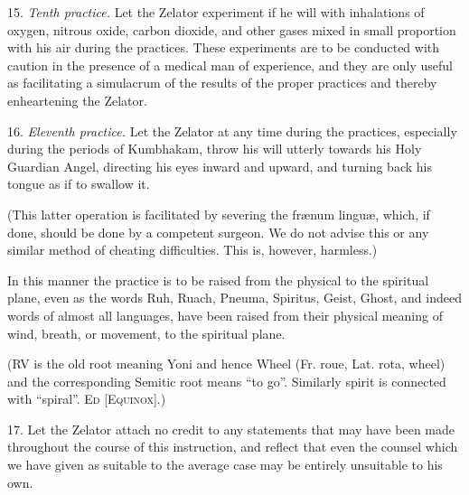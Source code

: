 15. \textit{Tenth practice.} \textemdash{} Let the Zelator experiment if he will with inhalations of oxygen, nitrous oxide, carbon dioxide, and other gases mixed in small proportion with his air during the practices. These experiments are to be conducted with caution in the presence of a medical man of experience, and they are only useful as facilitating a simulacrum of the results of the proper practices and thereby enheartening the Zelator.

16. \textit{Eleventh practice.} \textemdash{} Let the Zelator at any time during the practices, especially during the periods of Kumbhakam, throw his will utterly towards his Holy Guardian Angel, directing his eyes inward and upward, and turning back his tongue as if to swallow it.

(This latter operation is facilitated by severing the fr\ae{}num lingu\ae{}, which, if done, should be done by a competent surgeon. We do not advise this or any similar method of cheating difficulties. This is, however, harmless.)

In this manner the practice is to be raised from the physical to the spiritual plane, even as the words Ruh, Ruach, Pneuma, Spiritus, Geist, Ghost, and indeed words of almost all languages, have been raised from their physical meaning of wind, breath, or movement, to the spiritual plane.

(RV is the old root meaning Yoni and hence Wheel (Fr. roue, Lat. rota, wheel) and the corresponding Semitic root means \enquote{to go}. Similarly spirit is connected with \enquote{spiral}. \textemdash{} \textsc{Ed [Equinox]}.)

17. Let the Zelator attach no credit to any statements that may have been made throughout the course of this instruction, and reflect that even the counsel which we have given as suitable to the average case may be entirely unsuitable to his own.
